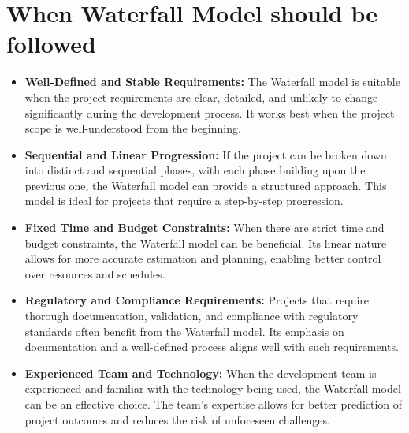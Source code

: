 \section{When Waterfall Model should be followed}
\vspace{0.2cm}
\begin{itemize}
\item \textbf{Well-Defined and Stable Requirements:} The Waterfall model is suitable when the project requirements are clear, detailed, and unlikely to change significantly during the development process. It works best when the project scope is well-understood from the beginning.
\item \textbf{Sequential and Linear Progression:} If the project can be broken down into distinct and sequential phases, with each phase building upon the previous one, the Waterfall model can provide a structured approach. This model is ideal for projects that require a step-by-step progression.
\item \textbf{Fixed Time and Budget Constraints:} When there are strict time and budget constraints, the Waterfall model can be beneficial. Its linear nature allows for more accurate estimation and planning, enabling better control over resources and schedules.
\item \textbf{Regulatory and Compliance Requirements:} Projects that require thorough documentation, validation, and compliance with regulatory standards often benefit from the Waterfall model. Its emphasis on documentation and a well-defined process aligns well with such requirements.
\item \textbf{Experienced Team and Technology:} When the development team is experienced and familiar with the technology being used, the Waterfall model can be an effective choice. The team's expertise allows for better prediction of project outcomes and reduces the risk of unforeseen challenges.
\end{itemize}